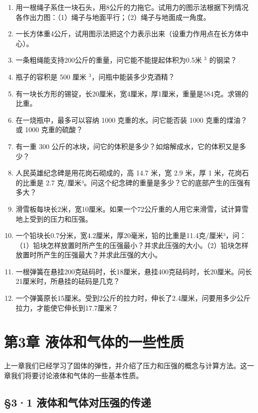 \begin{enumerate}
\def\labelenumi{\arabic{enumi}.}
\item
  用一根绳子系住一块石头，用8公斤的力拖它。试用力的图示法根据下列情况各作出力图：（1）绳子与地面平行；（2）绳子与地面成一角度。
\item
  一长方体重4公斤，试用图示法把这个力表示出来（设重力作用点在长方体中心）。
\item
  一条粗绳能支持200公斤的重量，问它能不能提起体积为0.5米 \(^{3}\)
  的钢梁？
\item
  瓶子的容积是 500 厘米 \(^{3}\)，问瓶中能装多少克酒精？
\item
  有一块长方形的锡锭，长20厘米，宽4厘米，厚1厘米，重量是584克。求锡的比重。
\item
  在一烧瓶中，最多可以容纳 1000 克重的水。问它能否装 1000 克重的煤油？或
  1000 克重的硫酸？
\item
  有一重 300
  公斤的冰块，问它的体积是多少？如熔解成水，它的体积又是多少？
\item
  人民英雄纪念碑是用花岗石砌成的，高 14.7 米，宽 2.9 米，厚 1
  米，花岗石的比重是 2.7
  克/厘米³。问这个纪念碑的重量是多少？它的底部产生的压强有多大？
\item
  滑雪板每块长2米，宽10厘米。如果一个72公斤重的人用它来滑雪，试计算雪地上受到的压力和压强。
\item
  一个铅块长0.7分米，宽4.2厘米，厚20毫米，铅的比重是11.4克/厘米³，问：（1）铅块怎样放置时所产生的压强最小？并求此压强的大小。（2）铅块怎样放置时所产生的压强最大？并求此压强的大小。
\item
  一根弹簧在悬挂200克砝码时，长18厘米，悬挂400克砝码时，长20厘米。问长21厘米时，所悬挂的砝码是几克？
\item
  一个弹簧原长15厘米。受到2公斤的拉力时，伸长了2.4厘米，问要用多少公斤拉力，才能使它伸长到17.7厘米？
\end{enumerate}

\chapter{第3章
液体和气体的一些性质}\label{ux7b2c3ux7ae0-ux6db2ux4f53ux548cux6c14ux4f53ux7684ux4e00ux4e9bux6027ux8d28}

上一章我们已经学习了固体的弹性，并介绍了压力和压强的概念与计算方法。这一章我们将要讨论液体和气体的一些基本性质。

\section{§3·1
液体和气体对压强的传递}\label{ux6db2ux4f53ux548cux6c14ux4f53ux5bf9ux538bux5f3aux7684ux4f20ux9012}

